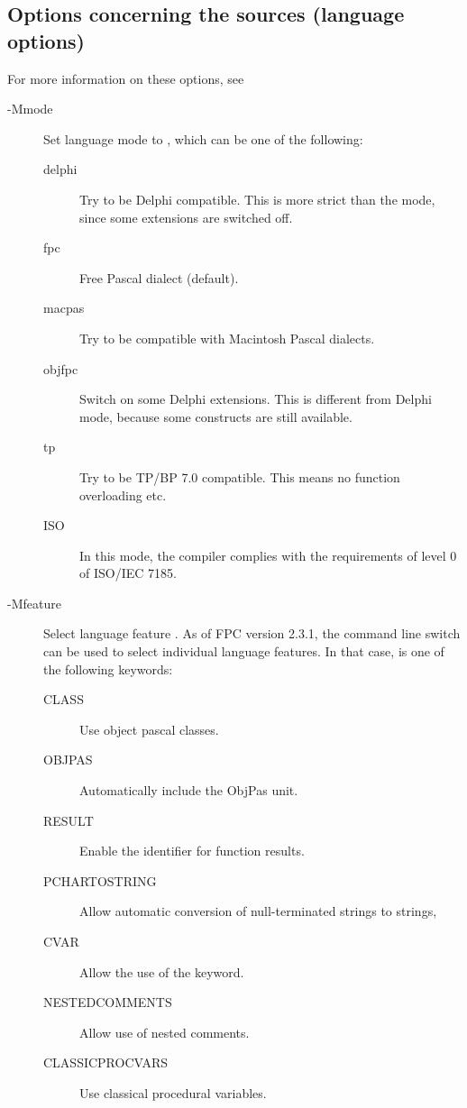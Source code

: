 
\subsection{Options concerning the sources (language options)}
\label{se:sourceoptions}
For more information on these options, see \progref
\begin{description}
\item[-Mmode]  Set language mode to , which can be one of the
following:
\begin{description}
\item[delphi] Try to be Delphi compatible. This is more strict
than the  mode, since some \fpc extensions are switched off.
\item[fpc] Free Pascal dialect (default).
\item[macpas] Try to be compatible with Macintosh Pascal dialects.
\item[objfpc] Switch on some Delphi extensions. This is different from
Delphi mode, because some \fpc constructs are still available.
\item[tp] Try to be TP/BP 7.0 compatible. This means no function overloading
etc.
\item[ISO] In this mode, the compiler complies with the requirements of level
0 of ISO/IEC 7185.
\end{description}
\item[-Mfeature]  Select language feature .
As of FPC version 2.3.1, the  command line switch can be used to select individual
language features. In that case,  is one of the following keywords:
\begin{description}
\item[CLASS] Use object pascal classes.
\item[OBJPAS] Automatically include the ObjPas unit.
\item[RESULT] Enable the  identifier for function results.
\item[PCHARTOSTRING] Allow automatic conversion of null-terminated strings
to strings,
\item[CVAR] Allow the use of the  keyword.
\item[NESTEDCOMMENTS] Allow use of nested comments.
\item[CLASSICPROCVARS] Use classical procedural variables.

\end{description}
\end{description}
